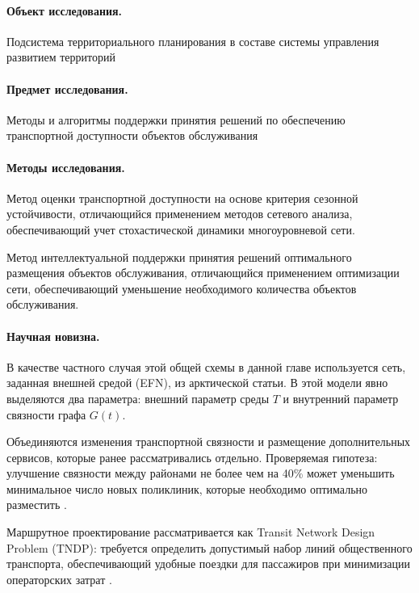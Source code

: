 \documentclass[14pt,a4paper]{extarticle}
\begin{document}
\paragraph*{Объект исследования.}
Подсистема территориального планирования в составе системы управления развитием территорий

\paragraph*{Предмет исследования.}
Методы и алгоритмы поддержки принятия решений по обеспечению транспортной доступности объектов обслуживания

\paragraph*{Методы исследования.}

Метод оценки транспортной доступности на основе критерия сезонной устойчивости, отличающийся применением методов сетевого анализа, обеспечивающий учет стохастической динамики многоуровневой сети.

Метод интеллектуальной поддержки принятия решений оптимального размещения объектов обслуживания, отличающийся применением оптимизации сети, обеспечивающий уменьшение необходимого количества объектов обслуживания.

\paragraph*{Научная новизна.}

В качестве частного случая этой общей схемы в данной главе используется сеть, заданная внешней средой (EFN), из арктической статьи. В этой модели явно выделяются два параметра: внешний параметр среды \(T\) и внутренний параметр связности графа \(G(t)\).

Объединяются изменения транспортной связности и размещение дополнительных сервисов, которые ранее рассматривались отдельно. Проверяемая гипотеза: улучшение связности между районами не более чем на 40\% может уменьшить минимальное число новых поликлиник, которые необходимо оптимально разместить \cite{kontsevik2024connectivityPlacement}.

Маршрутное проектирование рассматривается как Transit Network Design Problem (TNDP): требуется определить допустимый набор линий общественного транспорта, обеспечивающий удобные поездки для пассажиров при минимизации операторских затрат \cite{mandl1980tndp,duranMicco2022tndpReview,sahin2023linePlanning,morozov2026oneRuleTndp}.
\end{document}

